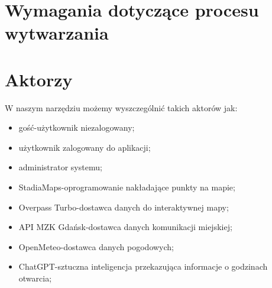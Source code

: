 \section{Wymagania dotyczące procesu wytwarzania}
\label{sec:wymagania-dotyczace-procesu-wytwarzania}

\begin{requirementstab}[label={tab:requirements:envfunc1},caption={Karta wymagania: Android}]
    \reqrelated{}
\end{requirementstab}
\begin{requirementstab}[label={tab:requirements:envfunc2},caption={Karta wymagania: Przeglądarka internetowa}]
    \reqrelated{}
\end{requirementstab}



\restoregeometry %

\section{Aktorzy}
\label{sec:aktorzy}

W naszym narzędziu możemy wyszczególnić takich aktorów jak:
    \begin{itemize}
       \item gość-użytkownik niezalogowany;
       \item użytkownik zalogowany do aplikacji;
       \item administrator systemu;
       \item StadiaMaps-oprogramowanie nakładające punkty na mapie;
       \item Overpass Turbo-dostawca danych do interaktywnej mapy;
       \item API MZK Gdańsk-dostawca danych komunikacji miejskiej;
       \item OpenMeteo-dostawca danych pogodowych;
       \item ChatGPT-sztuczna inteligencja przekazująca informacje o godzinach otwarcia;
    \end{itemize}

